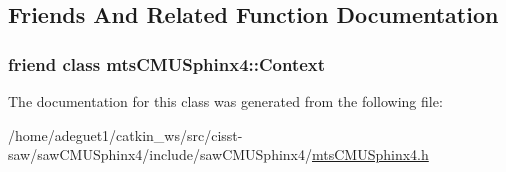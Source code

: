 \subsection{Friends And Related Function Documentation}
\hypertarget{classmts_c_m_u_sphinx4_1_1_word_actions_af6840ef284029e7e225d11062c8615e3}{
\subsubsection[{mts\-C\-M\-U\-Sphinx4\-::\-Context}]{\setlength{\rightskip}{0pt plus 5cm}friend class {\bf mts\-C\-M\-U\-Sphinx4\-::\-Context}\hspace{0.3cm}{\ttfamily [friend]}}}\label{classmts_c_m_u_sphinx4_1_1_word_actions_af6840ef284029e7e225d11062c8615e3}


The documentation for this class was generated from the following file\-:\begin{DoxyCompactItemize}
\item 
/home/adeguet1/catkin\-\_\-ws/src/cisst-\/saw/saw\-C\-M\-U\-Sphinx4/include/saw\-C\-M\-U\-Sphinx4/\hyperlink{mts_c_m_u_sphinx4_8h}{mts\-C\-M\-U\-Sphinx4.\-h}\end{DoxyCompactItemize}
